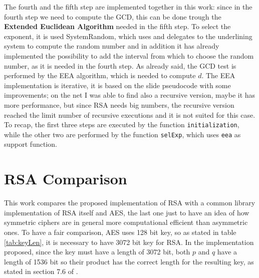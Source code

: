 \documentclass{article}
\begin{document}
The fourth and the fifth step are implemented together in this work: since in the fourth step we need to compute the GCD, this can be done trough the \textbf{Extended Euclidean Algorithm} needed in the fifth step. To select the exponent, it is used SystemRandom, which uses and delegates to the underlining system to compute the random number and in addition it has already implemented the possibility to add the interval from which to choose the random number, as it is needed in the fourth step. As already said, the GCD test is performed by the EEA algorithm, which is needed to compute $d$. The EEA implementation is iterative, it is based on the slide pseudocode with some improvements; on the net I was able to find also a recursive version, maybe it has more performance, but since RSA needs big numbers, the recursive version reached the limit number of recursive executions and it is not suited for this case.\newline
To recap, the first three steps are executed by the function \verb+initialization+, while the other two are performed by the function \verb+selExp+, which uses \verb+eea+ as support function.


\section{RSA Comparison}

This work compares the proposed implementation of RSA with a common library implementation of RSA itself and AES, the last one just to have an idea of how symmetric ciphers are in general more computational efficient than asymmetric ones. To have a fair comparison, AES uses 128 bit key, so as stated in table \ref{tab:keyLen}, it is necessary to have 3072 bit key for RSA. In the implementation proposed, since the key must have a length of 3072 bit, both $p$ and $q$ have a length of 1536 bit so their product has the correct length for the resulting key, as stated in section 7.6 of \cite{10.5555/1721909}.

\renewcommand{\arraystretch}{2}
\end{document}
